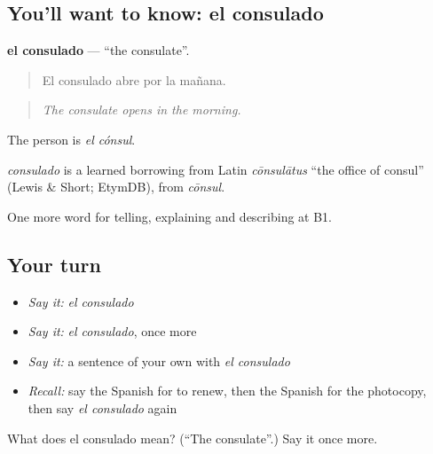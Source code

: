 \subsection*{You'll want to know: el consulado}
\textbf{el consulado} — \textquotedblleft{}the consulate\textquotedblright{}.

\begin{quote}
El consulado abre por la mañana.
\end{quote}

\begin{quote}
\emph{The consulate opens in the morning.}
\end{quote}

The person is \emph{el cónsul}.

\begin{cousinweb}
\emph{consulado} is a learned borrowing from Latin \emph{cōnsulātus} \textquotedblleft{}the office of consul\textquotedblright{} (Lewis \& Short; EtymDB), from \emph{cōnsul}.
\end{cousinweb}

\begin{grammarlens}[title={What you've built}]
One more word for telling, explaining and describing at B1.
\end{grammarlens}

\subsection*{Your turn}
\begin{itemize}
\raggedright
  \item \emph{Say it:} \emph{el consulado}
  \item \emph{Say it:} \emph{el consulado}, once more
  \item \emph{Say it:} a sentence of your own with \emph{el consulado}
  \item \emph{Recall:} say the Spanish for to renew, then the Spanish for the photocopy, then say \emph{el consulado} again
\end{itemize}

\begin{tcolorbox}[breakable,colback=teal!4,colframe=teal!35!black,title={Before you move on}]
What does el consulado mean? (\textquotedblleft{}The consulate\textquotedblright{}.) Say it once more.
\end{tcolorbox}

